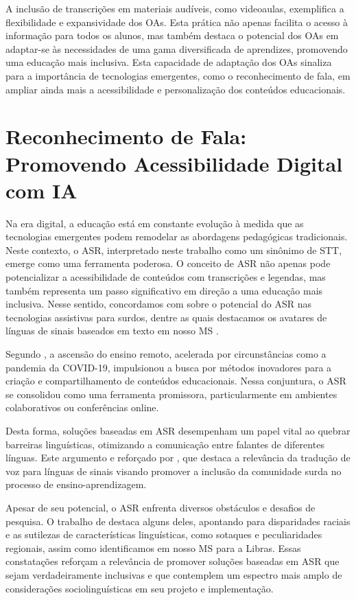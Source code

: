 A inclusão de transcrições em materiais audíveis, como videoaulas, exemplifica a flexibilidade e expansividade dos OAs. Esta prática não apenas facilita o acesso à informação para todos os alunos, mas também destaca o potencial dos OAs em adaptar-se às necessidades de uma gama diversificada de aprendizes, promovendo uma educação mais inclusiva. Esta capacidade de adaptação dos OAs sinaliza para a importância de tecnologias emergentes, como o reconhecimento de fala, em ampliar ainda mais a acessibilidade e personalização dos conteúdos educacionais.

\section{Reconhecimento de Fala: Promovendo Acessibilidade Digital com IA}
\label{section:foundation:asr}

Na era digital, a educação está em constante evolução à medida que as tecnologias emergentes podem remodelar as abordagens pedagógicas tradicionais. Neste contexto, o ASR, interpretado neste trabalho como um sinônimo de STT, emerge como uma ferramenta poderosa. O conceito de ASR não apenas pode potencializar a acessibilidade de conteúdos com transcrições e legendas, mas também representa um passo significativo em direção a uma educação mais inclusiva. Nesse sentido, concordamos com  sobre o potencial do ASR nas tecnologias assistivas para surdos, dentre as quais destacamos os avatares de línguas de sinais baseados em texto em nosso MS \cite{FalvoJr2020_SBIE, FalvoJr2020_FIE, FalvoJr2020_RENOTE}.

Segundo , a ascensão do ensino remoto, acelerada por circunstâncias como a pandemia da COVID-19, impulsionou a busca por métodos inovadores para a criação e compartilhamento de conteúdos educacionais. Nessa conjuntura, o ASR se consolidou como uma ferramenta promissora, particularmente em ambientes colaborativos ou conferências online. 

Desta forma, soluções baseadas em ASR desempenham um papel vital ao quebrar barreiras linguísticas, otimizando a comunicação entre falantes de diferentes línguas. Este argumento e reforçado por , que destaca a relevância da tradução de voz para línguas de sinais visando promover a inclusão da comunidade surda no processo de ensino-aprendizagem.

Apesar de seu potencial, o ASR enfrenta diversos obstáculos e desafios de pesquisa. O trabalho de  destaca alguns deles, apontando para disparidades raciais e as sutilezas de características linguísticas, como sotaques e peculiaridades regionais, assim como identificamos em nosso MS para a Libras. Essas constatações reforçam a relevância de promover soluções baseadas em ASR que sejam verdadeiramente inclusivas e que contemplem um espectro mais amplo de considerações sociolinguísticas em seu projeto e implementação.

